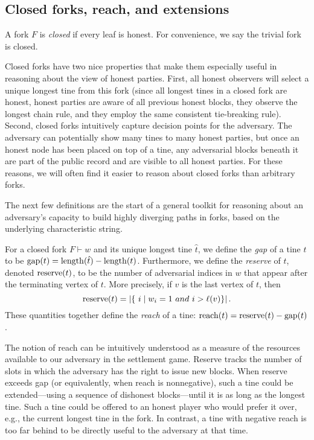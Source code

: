 
\subsection{Closed forks, reach, and extensions}
\begin{definition}
  A fork $F$ is \emph{closed} if every leaf is honest. For convenience, we say the trivial fork is closed.
\end{definition}
Closed forks have two nice properties that make them especially useful in reasoning about the view of honest parties.
First, 
all honest observers will select a unique longest tine from this fork 
(since all longest tines in a closed fork are honest, 
honest parties are aware of all previous honest blocks, 
they observe the longest chain rule, and they employ the same consistent tie-breaking rule).  
Second, 
closed forks intuitively capture decision points for the adversary.
The adversary can potentially show many tines to many honest parties, 
but once an honest node has been placed on top of 
a tine, any adversarial blocks beneath it are part of the public record and are visible to all honest parties. 
For these
reasons, we will often find it easier to reason about closed forks than arbitrary forks. %

The next few definitions are the start of a general toolkit for reasoning about an adversary's capacity to build highly diverging paths in forks, based on the underlying characteristic string.

\begin{definition}\label{def:gap-reserve-reach-mh}
For a closed fork $F \vdash w$ and its unique longest tine $\hat{t}$, we define the \emph{gap} of a tine $t$ to be $\operatorname{gap}(t)=\operatorname{length}(\hat{t})-\operatorname{length}(t)$.
Furthermore, we define the \emph{reserve} of $t$, denoted $\operatorname{reserve}(t)$, to be the number of adversarial indices in $w$ that appear after the terminating vertex of $t$. More precisely, if $v$ is the last vertex of $t$, then
\[
  \reserve(t)=|\{\ i \mid w_i=1 \ and \ i > \ell(v)\}|\,.
  \]
These quantities together define the \emph{reach} of a tine: $
\operatorname{reach}(t)=\operatorname{reserve}(t)-\operatorname{gap}(t)$.
\end{definition}

The notion of reach can be intuitively understood as a measure of
the resources available to our adversary in the settlement
game. Reserve tracks the number of slots in which the adversary has
the right to issue new blocks.  When reserve exceeds gap (or
equivalently, when reach is nonnegative), such a tine could be
extended---using a sequence of dishonest blocks---until it is as long
as the longest tine. Such a tine could be offered to an honest player
who would prefer it over, e.g., the current longest tine in the
fork. In contrast, a tine with negative reach is too far behind to be
directly useful to the adversary at that time.

